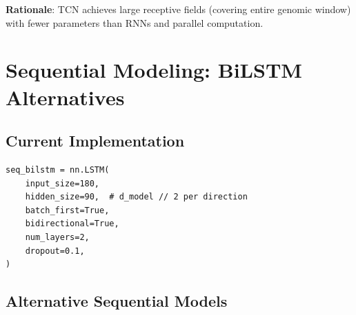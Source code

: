 \documentclass[11pt,a4paper]{article}
\begin{document}
\textbf{Rationale}: TCN achieves large receptive fields (covering entire genomic window) with fewer parameters than RNNs and parallel computation.

\section{Sequential Modeling: BiLSTM Alternatives}

\subsection{Current Implementation}

\begin{verbatim}
seq_bilstm = nn.LSTM(
    input_size=180,
    hidden_size=90,  # d_model // 2 per direction
    batch_first=True,
    bidirectional=True,
    num_layers=2,
    dropout=0.1,
)
\end{verbatim}

\subsection{Alternative Sequential Models}
\end{document}
